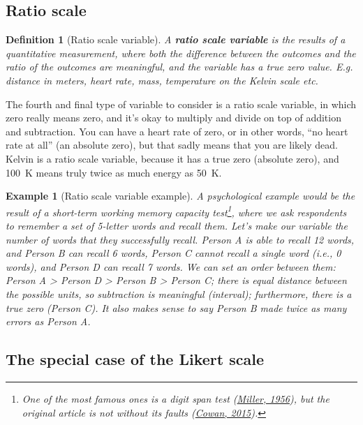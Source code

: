\documentclass[
  11pt,
]{book}
\theoremstyle{indenteddefinition}
\newtheorem{definition}{Definition}[chapter]
\theoremstyle{indenteddefinition}
\newtheorem{example}{Example}[chapter]
\theoremstyle{definition}
\theoremstyle{definition}
\theoremstyle{remark}
\begin{document}
\hypertarget{ratioscale}{%
\subsection{Ratio scale}\label{ratioscale}}

\begin{definition}[Ratio scale variable]
\protect\hypertarget{def:defratio}{}\label{def:defratio}A \textbf{ratio scale variable} is the results of a \emph{quantitative} measurement, where both the difference between the outcomes and the ratio of the outcomes are meaningful, and the variable has a true zero value. E.g. distance in meters, heart rate, mass, temperature on the Kelvin scale etc.
\end{definition}

The fourth and final type of variable to consider is a ratio scale variable, in which zero really means zero, and it's okay to multiply and divide on top of addition and subtraction. You can have a heart rate of zero, or in other words, ``no heart rate at all'' (an absolute zero), but that sadly means that you are likely dead. Kelvin is a ratio scale variable, because it has a true zero (absolute zero), and 100~K means truly twice as much energy as 50~K.

\begin{example}[Ratio scale variable example]
\protect\hypertarget{exm:exratio}{}\label{exm:exratio}A psychological example would be the result of a short-term working memory capacity test\footnote{One of the most famous ones is a digit span test (\protect\hyperlink{ref-millerMagicalNumberSeven1956}{Miller, 1956}), but the original article is not without its faults (\protect\hyperlink{ref-cowanGeorgeMillerMagical2015}{Cowan, 2015}).}, where we ask respondents to remember a set of 5-letter words and recall them. Let's make our variable the number of words that they successfully recall. Person A is able to recall 12 words, and Person B can recall 6 words, Person C cannot recall a single word (i.e., 0 words), and Person D can recall 7 words. We can set an \emph{order} between them: Person A \textgreater{} Person D \textgreater{} Person B \textgreater{} Person C; there is equal distance between the possible units, so subtraction is meaningful (\emph{interval}); furthermore, there is a true zero (Person C). It also makes sense to say Person B made twice as many errors as Person A.
\end{example}

\hypertarget{likertscale}{%
\subsection{The special case of the Likert scale}\label{likertscale}}
\end{document}
